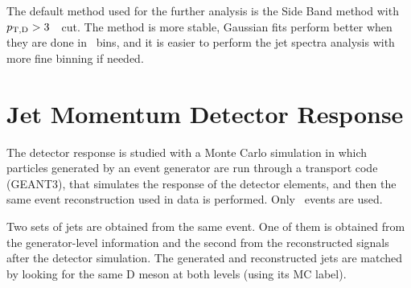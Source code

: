 The default method used for the further analysis is the Side Band method with $p_{\mathrm{T,D}}>3$~\GeVc\ cut. The method is more stable, Gaussian fits perform better when they are done in \ptd\ bins, and it is easier to perform the jet spectra analysis with more fine binning if needed.



\section{Jet Momentum Detector Response}

The detector response is studied with a Monte Carlo simulation in which particles generated by an event generator are
run through a transport code (GEANT3), that simulates the response of the detector elements, and then the same event reconstruction
used in data is performed. Only \ccbar\ events are used.

Two sets of jets are obtained from the same event. One of them is obtained from the generator-level information and the second from the reconstructed signals
after the detector simulation. 
The generated and reconstructed jets are matched by looking for the same D meson at both levels (using its MC label).

